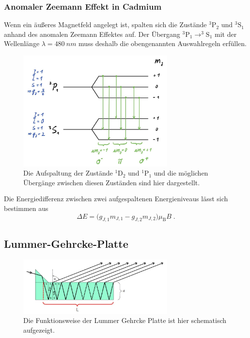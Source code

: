             \subsubsection*{Anomaler Zeemann Effekt in Cadmium}
            Wenn ein äußeres Magnetfeld angelegt ist, spalten sich die Zustände $^3\text{P}_2$ und $^3\text{S}_1$ anhand des anomalen Zeemann Effektes auf.
            Der Übergang $^3\text{P}_1 \rightarrow ^3\text{S}_1$ mit der Wellenlänge $\lambda = \SI{480}{nm}$ muss deshalb die obengenannten Auswahlregeln erfüllen.
            \begin{figure}[h]
                \center
                \includegraphics[width=0.7\textwidth]{bilder/anomalerZeemann.jpeg}
                \caption{Die Aufspaltung der Zustände $^1\text{D}_2$ und $^1\text{P}_1$ und die möglichen Übergänge zwischen diesen Zuständen sind hier dargestellt. \cite{tu_dortmund_versuchsanleitung_2021}}
                \label{fig:anomalerZeemann}
            \end{figure}
            \FloatBarrier
            Die Energiedifferenz zwischen zwei aufgespaltenen Energieniveaus lässt sich bestimmen aus
            \begin{equation}
                \Delta E = \bigl(g_{J,1} m_{J,1} - g_{J,2} m_{J,2}\bigr) \mu_{\text{B}} B \;.
            \end{equation}


    \subsection{Lummer-Gehrcke-Platte}
    \label{sec:platte}
        \begin{figure}[h]
            \center
            \includegraphics[width=0.7\textwidth]{bilder/LummerGehrckePlatte.jpeg}
            \caption{Die Funktionsweise der Lummer Gehrcke Platte ist hier schematisch aufgezeigt. \cite{tu_dortmund_versuchsanleitung_2021}}
            \label{fig:LummerGehrckePlatte}
        \end{figure}
        \FloatBarrier

